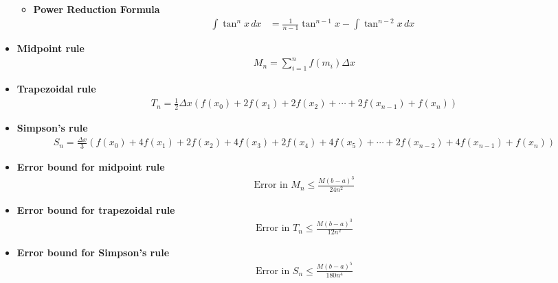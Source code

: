 \documentclass{report}
\begin{document}
\begin{itemize}
\begin{itemize}
                \item \textbf{Power Reduction Formula}
                \begin{align*}
                    \int \tan^n x \, dx &= \frac{1}{n-1} \tan^{n-1}x - \int \tan^{n-2}x \, dx
                \end{align*}
            \end{itemize}
         \item \textbf{Midpoint rule}
            \begin{align*}
                M_n = \sum_{i=1}^{n} f(m_i) \Delta x
            \end{align*}

            \item \textbf{Trapezoidal rule}
            \begin{align*}
                T_n = \frac{1}{2} \Delta x \left( f(x_0) + 2f(x_1) + 2f(x_2) + \cdots + 2f(x_{n-1}) + f(x_n) \right)
            \end{align*}

            \item \textbf{Simpson’s rule}
            \begin{align*}
                S_n = \frac{\Delta x}{3} \left( f(x_0) + 4f(x_1) + 2f(x_2) + 4f(x_3) + 2f(x_4) + 4f(x_5) + \cdots + 2f(x_{n-2}) + 4f(x_{n-1}) + f(x_n) \right)
            \end{align*}

            \item \textbf{Error bound for midpoint rule}
            \begin{align*}
                \text{Error in } M_n \leq \frac{M(b-a)^3}{24n^2}
            \end{align*}

            \item \textbf{Error bound for trapezoidal rule}
            \begin{align*}
                \text{Error in } T_n \leq \frac{M(b-a)^3}{12n^2}
            \end{align*}

            \item \textbf{Error bound for Simpson’s rule}
            \begin{align*}
                \text{Error in } S_n \leq \frac{M(b-a)^5}{180n^4}
            \end{align*}
    \end{itemize}
\end{document}
